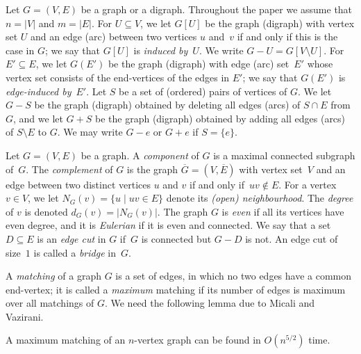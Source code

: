 \documentclass[11pt]{llncs}
\begin{document}
Let $G=(V,E)$ be a graph or a digraph.  Throughout the paper we assume that
$n=|V|$ and $m=|E|$.  For $U\subseteq V$, we let $G[U]$  be the graph (digraph)
with vertex set $U$ and an edge (arc) between two vertices $u$ and~$v$ if and
only if this is the case in $G$; we say that $G[U]$ is \emph{induced by}~$U$.
We write $G-U=G[V\setminus U]$.  For $E'\subseteq E$, we let $G(E')$ be the
graph (digraph) with edge (arc) set~$E'$ whose vertex set consists of the
end-vertices of the edges in $E'$; we say that $G(E')$ is \emph{edge-induced
by}~$E'$.  Let $S$ be a set of (ordered) pairs of vertices of $G$.  We let
$G-S$ be the graph (digraph) obtained by deleting all edges (arcs) of $S\cap E$
from~$G$, and we let $G+S$ be the graph (digraph) obtained by adding all edges
(arcs) of $S\setminus E$ to $G$.  We may write $G-e$ or $G+e$ if $S=\{e\}$.

Let $G=(V,E)$ be a graph.  A {\em component} of $G$ is a maximal connected subgraph
of~$G$.  The {\em complement}  of $G$  is the graph $\overline{G}=(V,\overline{E})$
with vertex set~$V$ and an edge between two distinct vertices $u$ and $v$ if and only
if~$uv\notin E$.   For a vertex $v\in V$, we
let $N_G(v)=\{u \mid uv\in E\}$ denote its \emph{(open) neighbourhood}.  The
\emph{degree} of  $v$ is denoted $d_G(v)=|N_G(v)|$. The graph $G$  is {\em even}
if all its vertices have even degree, and it is {\em Eulerian} if it is even
and connected.  We say that a set $D\subseteq E$ is an {\em edge cut} in $G$
if~$G$ is connected but $G-D$ is not.  An edge cut of size~$1$ is called a {\em
bridge} in~$G$.

A \emph{matching} of a graph $G$ is a set of edges, in which no two edges have
a common end-vertex; it is called a {\em maximum} matching if its number of
edges is maximum over all matchings of $G$.  We need the following lemma due to
Micali and Vazirani.

\begin{lemma}\label{l-mic}
A maximum matching of an $n$-vertex graph can be found in $O(n^{5/2})$ 
time.
\end{lemma}
\end{document}
